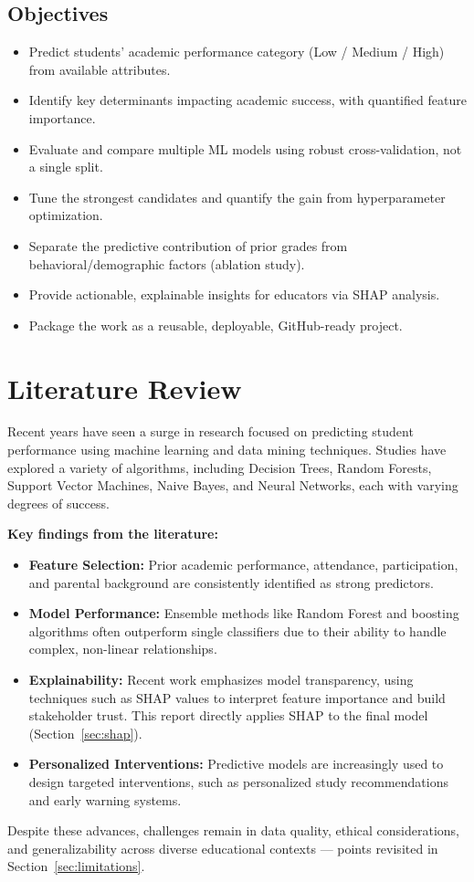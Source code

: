 \documentclass[12pt, a4paper]{article}
\begin{document}
\subsection*{Objectives}
\begin{itemize}[noitemsep]
    \item Predict students' academic performance category (Low / Medium / High) from available attributes.
    \item Identify key determinants impacting academic success, with quantified feature importance.
    \item Evaluate and compare multiple ML models using robust cross-validation, not a single split.
    \item Tune the strongest candidates and quantify the gain from hyperparameter optimization.
    \item Separate the predictive contribution of prior grades from behavioral/demographic factors (ablation study).
    \item Provide actionable, explainable insights for educators via SHAP analysis.
    \item Package the work as a reusable, deployable, GitHub-ready project.
\end{itemize}

\section{Literature Review}
Recent years have seen a surge in research focused on predicting student performance using
machine learning and data mining techniques. Studies have explored a variety of algorithms,
including Decision Trees, Random Forests, Support Vector Machines, Naive Bayes, and Neural
Networks, each with varying degrees of success.

\textbf{Key findings from the literature:}
\begin{itemize}[noitemsep]
    \item \textbf{Feature Selection:} Prior academic performance, attendance, participation,
    and parental background are consistently identified as strong predictors.
    \item \textbf{Model Performance:} Ensemble methods like Random Forest and boosting
    algorithms often outperform single classifiers due to their ability to handle complex,
    non-linear relationships.
    \item \textbf{Explainability:} Recent work emphasizes model transparency, using techniques
    such as SHAP values to interpret feature importance and build stakeholder trust. This
    report directly applies SHAP to the final model (Section~\ref{sec:shap}).
    \item \textbf{Personalized Interventions:} Predictive models are increasingly used to
    design targeted interventions, such as personalized study recommendations and early
    warning systems.
\end{itemize}
Despite these advances, challenges remain in data quality, ethical considerations, and
generalizability across diverse educational contexts — points revisited in
Section~\ref{sec:limitations}.
\end{document}
